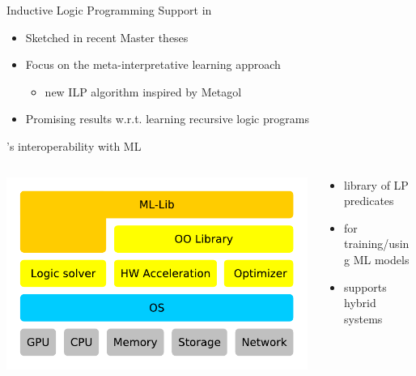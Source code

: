 \documentclass[presentation]{beamer}\mode<presentation>{\usetheme{AMSBolognaFC}}
\begin{document}
\begin{frame}{Inductive Logic Programming Support in \twopkt{}}
    \begin{itemize}
        \item Sketched in recent Master theses
        
        \vfill

        \item Focus on the meta-interpretative learning approach
        \begin{itemize}
            \item new ILP algorithm inspired by Metagol
        \end{itemize}

        \vfill

        \item Promising results w.r.t. learning recursive logic programs
    \end{itemize}
\end{frame}

\begin{frame}{\twopkt{}'s interoperability with ML}
    \begin{columns}
        \begin{column}{.35\linewidth}
            \includegraphics[width=\linewidth]{figures/layers.pdf}
        \end{column}
        \begin{column}{.65\linewidth}
            \begin{itemize}
                \item library of LP predicates
                \item for training/using ML models
                \item supports hybrid systems
            \end{itemize}
        \end{column}
    \end{columns}
\end{frame}
\end{document}
